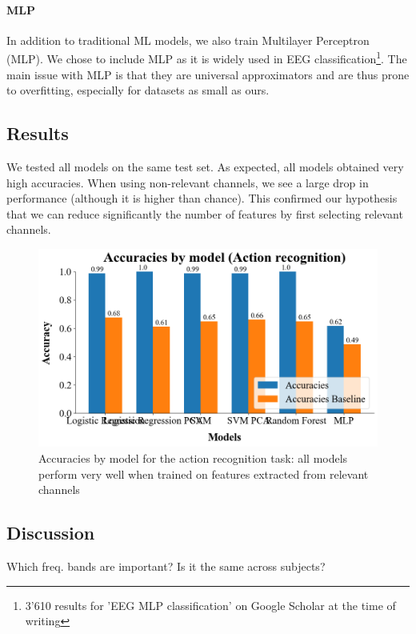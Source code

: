 \documentclass[10pt,conference,compsocconf]{IEEEtran}
\begin{document}
\paragraph{MLP}
In addition to traditional ML models, we also train Multilayer Perceptron (MLP). We chose to include MLP as it is widely used in EEG classification\footnote{3'610 results for 'EEG MLP classification' on Google Scholar at the time of writing}. The main issue with MLP is that they are universal approximators and are thus prone to overfitting, especially for datasets as small as ours.

\subsection{Results}
We tested all models on the same test set. As expected, all models obtained very high accuracies. When using non-relevant channels, we see a large drop in performance (although it is higher than chance). This confirmed our hypothesis that we can reduce significantly the number of features by first selecting relevant channels.

\begin{figure}[h!]
  \center
  \includegraphics[width=\linewidth]{images/2024-12-15-14-35-58.png}
  \caption{Accuracies by model for the action recognition task: all models perform very well when trained on features extracted from relevant channels}
\end{figure}
\FloatBarrier

\subsection{Discussion}
Which freq. bands are important? Is it the same across subjects?
\end{document}
